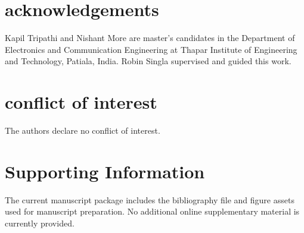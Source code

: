 \documentclass[num-refs]{wiley-article}
\begin{document}
  \section*{acknowledgements}

  Kapil Tripathi and Nishant More are master's candidates in the Department of Electronics and Communication Engineering at Thapar Institute of Engineering and Technology, Patiala, India. Robin Singla supervised and guided this work.


  \section*{conflict of interest}

  The authors declare no conflict of interest.


  \section*{Supporting Information}

  The current manuscript package includes the bibliography file and figure assets used for manuscript preparation. No additional online supplementary material is currently provided.


  \printendnotes


  

  
\end{document}

